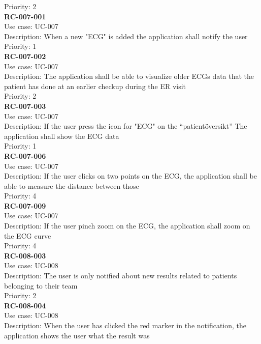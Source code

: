 Priority: 2 \\
\newline
\textbf{RC-007-001} \\
Use case: UC-007 \\
Description: When a new "ECG" is added the application shall notify the user \\
Priority: 1 \\
\newline
\textbf{RC-007-002} \\
Use case: UC-007 \\
Description: The application shall be able to visualize older ECGs data that the patient has done at an earlier checkup during the ER visit\\
Priority: 2 \\
\newline
\textbf{RC-007-003} \\
Use case: UC-007 \\
Description: If the user press the icon for "ECG" on the “patientöversikt” The application shall show the ECG data \\
Priority: 1 \\
\newline
\textbf{RC-007-006} \\
Use case: UC-007 \\
Description: If the user clicks on two points on the ECG, the application shall be able to measure the distance between those \\
Priority: 4 \\
\newline
\textbf{RC-007-009} \\
Use case: UC-007 \\
Description: If the user pinch zoom on the ECG, the application shall zoom on the ECG curve\\
Priority: 4 \\
\newline
\textbf{RC-008-003} \\
Use case: UC-008 \\
Description: The user is only notified about new results related to patients belonging to their team \\
Priority: 2 \\
\newline
\textbf{RC-008-004} \\
Use case: UC-008 \\
Description: When the user has clicked the red marker in the notification, the application shows the user what the result was \\
